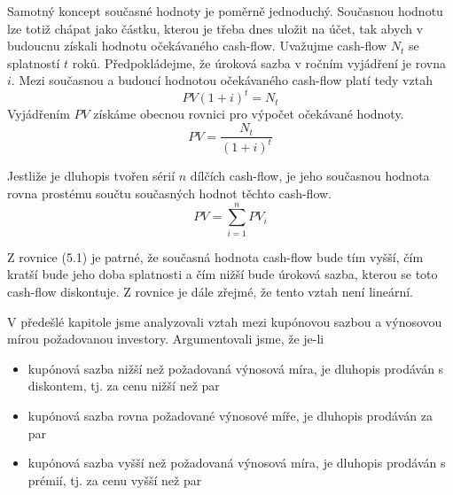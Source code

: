 \documentclass[a4paper]{book}
\begin{document}
Samotný koncept současné hodnoty je poměrně jednoduchý. Současnou hodnotu lze totiž chápat jako částku, kterou je třeba dnes uložit na účet, tak abych v budoucnu získali hodnotu očekávaného cash-flow. Uvažujme cash-flow $N_t$ se splatností $t$ roků. Předpokládejme, že úroková sazba v ročním vyjádření je rovna $i$. Mezi současnou a budoucí hodnotou očekávaného cash-flow platí tedy vztah
\begin{equation*}
PV (1 + i)^t = N_t
\end{equation*}
Vyjádřením $PV$ získáme obecnou rovnici pro výpočet očekávané hodnoty.
\begin{equation}
PV = \frac{N_t}{(1 + i)^t}
\end{equation}

Jestliže je dluhopis tvořen sérií $n$ dílčích cash-flow, je jeho současnou hodnota rovna prostému součtu současných hodnot těchto cash-flow.
\begin{equation*}
PV = \sum_{i = 1}^n PV_i
\end{equation*}

Z rovnice (5.1) je patrné, že současná hodnota cash-flow bude tím vyšší, čím kratší bude jeho doba splatnosti a čím nižší bude úroková sazba, kterou se toto cash-flow diskontuje. Z rovnice je dále zřejmé, že tento vztah není lineární.

V předešlé kapitole jsme analyzovali vztah mezi kupónovou sazbou a výnosovou mírou požadovanou investory. Argumentovali jsme, že je-li
\begin{itemize}
\item kupónová sazba nižší než požadovaná výnosová míra, je dluhopis prodáván s diskontem, tj. za cenu nižší než par
\item kupónová sazba rovna požadované výnosové míře, je dluhopis prodáván za par
\item kupónová sazba vyšší než požadovaná výnosová míra, je dluhopis prodáván s prémií, tj. za cenu vyšší než par
\end{itemize}
\end{document}

